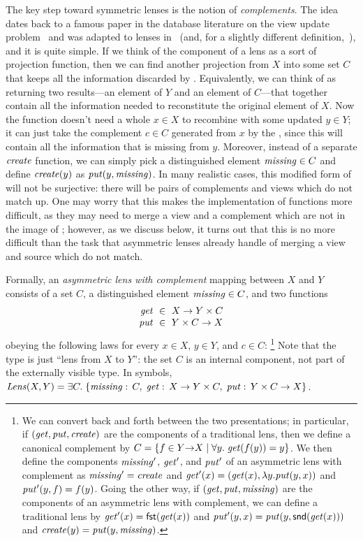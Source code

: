 %
The key  step toward symmetric lenses is the notion
of {\em complements}.  The idea dates back to a famous paper in the
database literature on the view update
problem~\cite{DBLP:journals/tods/BancilhonS81} and was adapted to
lenses in~\cite{Matching10} (and, for a slightly different
definition,~\cite{matsuda2007btb}), and it is quite simple.  If we think of
the    
\GET{} component of a lens as a sort of projection function, then we can find
another projection from $X$ into some set $C$ that
keeps all the information discarded by \GET{}.  Equivalently, we can think
of \GET{} as returning two results---an element of $Y$ and an element of
$C$---that together contain all the information needed to reconstitute the
original element of $X$.  Now the \PUT{} function doesn't need a whole $x\in
X$ to recombine with some updated $y\in Y$; it can
just take the complement $c\in C$ generated from $x$ by the \GET, since this
will 
contain all the information that is missing from $y$.  Moreover, instead of
a separate
$\mathit{create}$ function, we can simply pick a distinguished element
$\mathit{missing}\in C$ and define $\mathit{create}(y)$ as $\mathit{put}(y,\mathit{missing})$.
\ifcomplement
In many realistic cases, this modified form of \GET will not be surjective:
there will be pairs of complements and views which do not match up. One may
worry that this makes the implementation of \PUT functions more difficult,
as they may need to merge a view and a complement which are not in the image
of \GET; however, as we discuss below, it turns out that this is no more
difficult than the task that asymmetric lenses already handle of merging a
view and source which do not match.
\fi

Formally, an {\em asymmetric lens with complement}
mapping between $X$ and $Y$ consists of a set $C$, a
distinguished element $\mathit{missing} \in C$, and two functions
\[
\begin{array}{r@{\ \;}c@{\ \;}l}
\GET &\in& X \arrow Y \times C\\
\PUT &\in& Y \times C \arrow X
\end{array}
\]
obeying the following laws for every $x \in X$, $y \in Y$, and $c \in C$:%
\footnote{We can convert back and
forth between the two presentations; in particular, if $(\mathit{get}, \mathit{put},
\mathit{create})$ are the components of a traditional lens, then we define a
canonical complement by $C=\{f\in Y{\rightarrow}X\mid \forall
y.\;\mathit{get}(f(y))=y\}$. We then define the components $\mathit{missing}'$, $\mathit{get}'$, and
$\mathit{put}'$ 
of an asymmetric lens with complement as $\mathit{missing}'=\mathit{create}$ and
$\mathit{get}'(x)=(\mathit{get}(x),\lambda y.\mathit{put}(y,x))$ and $\mathit{put}'(y,f)=f(y)$.
\iffull
Going the other way, if $(\mathit{get}, \mathit{put}, \mathit{missing})$ are the components of an
asymmetric lens with complement, we can define a traditional lens by
$\mathit{get}'(x) = \mathsf{fst}(\mathit{get}(x))$ and $\mathit{put}'(y,x) = \mathit{put}(y,\mathsf{snd}(\mathit{get}(x)))$
and $\mathit{create}(y) = \mathit{put}(y,\mathit{missing})$.
\fi
}
%
Note that the type is just ``lens from $X$ to $Y$'': the set
$C$ is an internal component, not part of the externally visible type.
In symbols, $ \mathit{Lens}(X,Y) =
\exists C.\; \{ \mathord{\mathit{missing}}:\, C,\; \mathit{get}:\,X \rightarrow Y
\times C,\; \mathit{put}:\,Y \times C \rightarrow X \}$.

